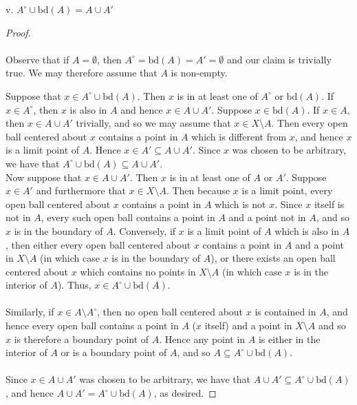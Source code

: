 \pagebreak


v. $A^{\circ} \cup \text{bd}(A) = A \cup A'$ \ \\
    
\begin{proof}\renewcommand{\qedsymbol}{}\ \\\\
    Observe that if $A = \emptyset$, then $A^\circ = \text{bd}(A) = A' = \emptyset$ and our claim is trivially true. We 
    may therefore assume that $A$ is non-empty.

    Suppose that $x \in A^\circ \cup \text{bd}(A)$. Then $x$ is in at least one of $A^\circ$ or 
    $\text{bd}(A)$. If $x \in A^\circ$, then $x$ is also in $A$ and hence $x \in A \cup A'$.  Suppose 
    $x \in \text{bd}(A)$. If $x \in A$, then $x \in A \cup A'$ trivially, and so we may assume that 
    $x \in X \setminus A$. Then every open ball centered about $x$ contains a point in $A$ which is different from $x$, 
    and hence $x$ is a limit point of $A$.  Hence $x \in A' \subseteq A \cup A'$. Since $x$ was chosen to be arbitrary, 
    we have that $A^\circ \cup \text{bd}(A) \subseteq A \cup A'$.
    \ \\
    Now suppose that $x \in A \cup A'$. Then $x$ is in at least one of $A$ or $A'$. Suppose $x \in A'$ and furthermore
    that $x \in X \setminus A$. Then because $x$ is a limit point, every open ball centered about $x$ contains a point
    in $A$ which is not $x$. Since $x$ itself is not in $A$, every such open ball contains a point in $A$ and a 
    point not in $A$, and so $x$ is in the boundary of $A$. Conversely, if $x$ is
    a limit point of $A$ which is also in $A$, then either every open ball centered about $x$ contains a point in $A$
    and a point in $X \setminus A$ (in which case $x$ is in the boundary of $A$), or there exists an open ball centered 
    about $x$ which contains no points in $X \setminus A$ (in which case $x$ is in the interior of $A$). Thus, 
    $x \in A^\circ \cup \text{bd}(A)$. 
    \ \\\\
    Similarly, if $x \in A \setminus A^\circ$, then no open ball centered about $x$ is
    contained in $A$, and hence every open ball contains a point in $A$ ($x$ itself) and a point in $X \setminus A$ and
    so $x$ is therefore a boundary point of $A$. Hence any point in $A$ is either in the interior of $A$ or is a
    boundary point of $A$, and so $A \subseteq A^\circ \cup \text{bd}(A)$.
    \ \\\\
    Since $x \in A \cup A'$ was chosen to be arbitrary, we have that $A \cup A' \subseteq A^\circ \cup \text{bd}(A)$, 
    and hence $A \cup A' = A^\circ \cup \text{bd}(A)$, as desired.
\end{proof}

